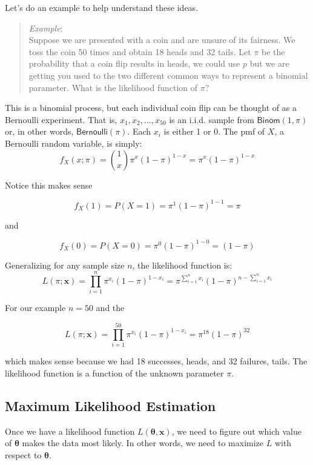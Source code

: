 \documentclass[
  letterpaper,
  DIV=11,
  numbers=noendperiod]{scrreprt}
\begin{document}
Let's do an example to help understand these ideas.

\begin{quote}
\emph{Example}:\\
Suppose we are presented with a coin and are unsure of its fairness. We
toss the coin 50 times and obtain 18 heads and 32 tails. Let \(\pi\) be
the probability that a coin flip results in heads, we could use \(p\)
but we are getting you used to the two different common ways to
represent a binomial parameter. What is the likelihood function of
\(\pi\)?
\end{quote}

This is a binomial process, but each individual coin flip can be thought
of as a Bernoulli experiment. That is, \(x_1,x_2,...,x_{50}\) is an
i.i.d. sample from \(\textsf{Binom}(1,\pi)\) or, in other words,
\(\textsf{Bernoulli}(\pi)\). Each \(x_i\) is either 1 or 0. The pmf of
\(X\), a Bernoulli random variable, is simply: \[
f_X(x;\pi)= \binom{1}{x} \pi^x(1-\pi)^{1-x} = \pi^x(1-\pi)^{1-x}
\]

Notice this makes sense

\[
f_X(1)=P(X=1)= \pi^1(1-\pi)^{1-1}=\pi
\]

and

\[
f_X(0)=P(X=0)= \pi^0(1-\pi)^{1-0}=(1-\pi)
\]

Generalizing for any sample size \(n\), the likelihood function is: \[
L(\pi;\boldsymbol{x})=\prod_{i=1}^{n} \pi^{x_i}(1-\pi)^{1-x_i} = \pi^{\sum_{i=1}^{n} x_i}(1-\pi)^{n-\sum_{i=1}^{n} x_i}
\]

For our example \(n=50\) and the

\[
L(\pi;\boldsymbol{x})=\prod_{i=1}^{50} \pi^{x_i}(1-\pi)^{1-x_i} = \pi^{18}(1-\pi)^{32}
\]

which makes sense because we had 18 successes, heads, and 32 failures,
tails. The likelihood function is a function of the unknown parameter
\(\pi\).

\subsection{Maximum Likelihood
Estimation}\label{maximum-likelihood-estimation}

Once we have a likelihood function
\(L(\boldsymbol{\theta},\boldsymbol{x})\), we need to figure out which
value of \(\boldsymbol{\theta}\) makes the data most likely. In other
words, we need to maximize \(L\) with respect to
\(\boldsymbol{\theta}\).
\end{document}
